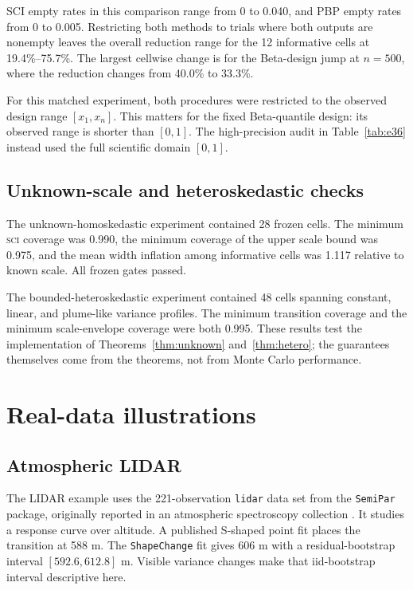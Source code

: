 \documentclass{interact}
\theoremstyle{definition}
\theoremstyle{remark}
\newcommand{\SCI}{\textnormal{\textsc{sci}}\xspace}
\begin{document}
SCI empty rates in this comparison range from 0 to 0.040, and PBP empty rates
from 0 to 0.005.  Restricting both methods to trials where both outputs are
nonempty leaves the overall reduction range for the 12 informative cells at
19.4\%--75.7\%.  The largest cellwise change is for the Beta-design jump at
$n=500$, where the reduction changes from 40.0\% to 33.3\%.

For this matched experiment, both procedures were restricted to the observed
design range $[x_1,x_n]$.  This matters for the fixed Beta-quantile design: its observed
range is shorter than $[0,1]$.  The high-precision audit in
Table~\ref{tab:e36} instead used the full scientific domain $[0,1]$.

\subsection{Unknown-scale and heteroskedastic checks}

The unknown-homoskedastic experiment contained 28 frozen cells.  The minimum
\SCI coverage was 0.990, the minimum coverage of the upper scale bound was
0.975, and the mean width inflation among informative cells was 1.117 relative
to known scale.  All frozen gates passed.

The bounded-heteroskedastic experiment contained 48 cells spanning constant,
linear, and plume-like variance profiles.  The minimum transition coverage and
the minimum scale-envelope coverage were both 0.995.  These results test the
implementation of Theorems~\ref{thm:unknown} and~\ref{thm:hetero}; the guarantees
themselves come from the theorems, not from Monte Carlo performance.

\section{Real-data illustrations}
\label{sec:data}

\subsection{Atmospheric LIDAR}

The LIDAR example uses the 221-observation \texttt{lidar} data set from the
\texttt{SemiPar} package, originally reported in an atmospheric spectroscopy
collection \citep{sigrist1994air,ruppert2003semiparametric}.  It studies a
response curve over altitude.  A published
S-shaped point fit places the transition at 588 m.  The
\texttt{ShapeChange} fit gives 606 m with a residual-bootstrap interval
$[592.6,612.8]$ m.  Visible variance changes make that iid-bootstrap interval
descriptive here.
\end{document}
